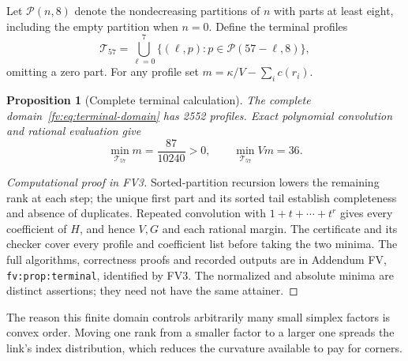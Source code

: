 \documentclass[11pt]{article}
\newtheorem{proposition}[theorem]{Proposition}
\theoremstyle{remark}\newtheorem{remark}[theorem]{Remark}
\numberwithin{equation}{section}
\begin{document}
Let $\mathcal P(n,8)$ denote the nondecreasing partitions of $n$
with parts at least eight, including the empty partition when
$n=0$. Define the terminal profiles
\begin{equation}\label{fv:eq:terminal-domain}
 \mathcal T_{57}=\bigcup_{\ell=0}^{7}
 \{(\ell,p):p\in\mathcal P(57-\ell,8)\},
\end{equation}
omitting a zero part. For any profile set
$m=\kappa/V-\sum_i c(r_i)$.

\begin{proposition}[Complete terminal calculation]\label{fv:prop:terminal}
The complete domain~\eqref{fv:eq:terminal-domain} has 2552 profiles.
Exact polynomial convolution and rational evaluation give
\[
 \min_{\mathcal T_{57}}m=\frac{87}{10240}>0,
 \qquad \min_{\mathcal T_{57}}Vm=36.
\]
\end{proposition}
\begin{proof}[Computational proof in FV3]
Sorted-partition recursion lowers the remaining rank at each step;
the unique first part and its sorted tail establish completeness
and absence of duplicates. Repeated convolution with
$1+t+\cdots+t^r$ gives every coefficient of $H$, and hence $V,G$
and each rational margin. The certificate and its checker cover
every profile and coefficient list before taking the two minima.
The full algorithms, correctness proofs and recorded outputs are
in Addendum FV, \texttt{fv:prop:terminal}, identified by FV3.
The normalized and absolute minima are distinct assertions;
they need not have the same attainer.
\end{proof}

The reason this finite domain controls arbitrarily many small
simplex factors is convex order. Moving one rank from a smaller
factor to a larger one spreads the link's index distribution,
which reduces the curvature available to pay for corners.
\end{document}
